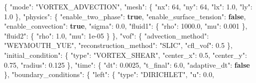 \documentclass[
  10pt,
]{article}
\newenvironment{Shaded}{}{}
\newcommand{\DataTypeTok}[1]{\textcolor[rgb]{0.56,0.13,0.00}{#1}}
\newcommand{\DecValTok}[1]{\textcolor[rgb]{0.25,0.63,0.44}{#1}}
\newcommand{\FloatTok}[1]{\textcolor[rgb]{0.25,0.63,0.44}{#1}}
\newcommand{\FunctionTok}[1]{\textcolor[rgb]{0.02,0.16,0.49}{#1}}
\newcommand{\KeywordTok}[1]{\textcolor[rgb]{0.00,0.44,0.13}{\textbf{#1}}}
\newcommand{\StringTok}[1]{\textcolor[rgb]{0.25,0.44,0.63}{#1}}
\begin{document}
\begin{Shaded}
\begin{Highlighting}[]
\FunctionTok{\{}
  \DataTypeTok{"mode"}\FunctionTok{:} \StringTok{"VORTEX\_ADVECTION"}\FunctionTok{,}
  \DataTypeTok{"mesh"}\FunctionTok{:} \FunctionTok{\{}
    \DataTypeTok{"nx"}\FunctionTok{:} \DecValTok{64}\FunctionTok{,}
    \DataTypeTok{"ny"}\FunctionTok{:} \DecValTok{64}\FunctionTok{,}
    \DataTypeTok{"lx"}\FunctionTok{:} \FloatTok{1.0}\FunctionTok{,}
    \DataTypeTok{"ly"}\FunctionTok{:} \FloatTok{1.0}
  \FunctionTok{\},}
  \DataTypeTok{"physics"}\FunctionTok{:} \FunctionTok{\{}
    \DataTypeTok{"enable\_two\_phase"}\FunctionTok{:} \KeywordTok{true}\FunctionTok{,}
    \DataTypeTok{"enable\_surface\_tension"}\FunctionTok{:} \KeywordTok{false}\FunctionTok{,}
    \DataTypeTok{"enable\_convection"}\FunctionTok{:} \KeywordTok{true}\FunctionTok{,}
    \DataTypeTok{"sigma"}\FunctionTok{:} \FloatTok{0.0}\FunctionTok{,}
    \DataTypeTok{"fluid1"}\FunctionTok{:} \FunctionTok{\{}
      \DataTypeTok{"rho"}\FunctionTok{:} \FloatTok{1000.0}\FunctionTok{,}
      \DataTypeTok{"mu"}\FunctionTok{:} \FloatTok{0.001}
    \FunctionTok{\},}
    \DataTypeTok{"fluid2"}\FunctionTok{:} \FunctionTok{\{}
      \DataTypeTok{"rho"}\FunctionTok{:} \FloatTok{1.0}\FunctionTok{,}
      \DataTypeTok{"mu"}\FunctionTok{:} \DecValTok{1e{-}05}
    \FunctionTok{\}}
  \FunctionTok{\},}
  \DataTypeTok{"vof"}\FunctionTok{:} \FunctionTok{\{}
    \DataTypeTok{"advection\_method"}\FunctionTok{:} \StringTok{"WEYMOUTH\_YUE"}\FunctionTok{,}
    \DataTypeTok{"reconstruction\_method"}\FunctionTok{:} \StringTok{"SLIC"}\FunctionTok{,}
    \DataTypeTok{"cfl\_vof"}\FunctionTok{:} \FloatTok{0.5}
  \FunctionTok{\},}
  \DataTypeTok{"initial\_condition"}\FunctionTok{:} \FunctionTok{\{}
    \DataTypeTok{"type"}\FunctionTok{:} \StringTok{"VORTEX\_SHEAR"}\FunctionTok{,}
    \DataTypeTok{"center\_x"}\FunctionTok{:} \FloatTok{0.5}\FunctionTok{,}
    \DataTypeTok{"center\_y"}\FunctionTok{:} \FloatTok{0.75}\FunctionTok{,}
    \DataTypeTok{"radius"}\FunctionTok{:} \FloatTok{0.125}
  \FunctionTok{\},}
  \DataTypeTok{"time"}\FunctionTok{:} \FunctionTok{\{}
    \DataTypeTok{"dt"}\FunctionTok{:} \FloatTok{0.0025}\FunctionTok{,}
    \DataTypeTok{"t\_final"}\FunctionTok{:} \FloatTok{6.0}\FunctionTok{,}
    \DataTypeTok{"adaptive\_dt"}\FunctionTok{:} \KeywordTok{false}
  \FunctionTok{\},}
  \DataTypeTok{"boundary\_conditions"}\FunctionTok{:} \FunctionTok{\{}
    \DataTypeTok{"left"}\FunctionTok{:} \FunctionTok{\{}
      \DataTypeTok{"type"}\FunctionTok{:} \StringTok{"DIRICHLET"}\FunctionTok{,}
      \DataTypeTok{"u"}\FunctionTok{:} \FloatTok{0.0}\FunctionTok{,}

\end{Highlighting}
\end{Shaded}
\end{document}
